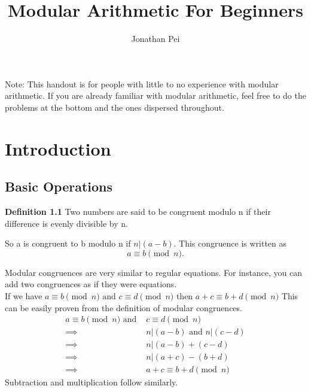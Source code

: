 \documentclass{article}
\begin{document}
\title{Modular Arithmetic For Beginners}
\author{Jonathan Pei}
\maketitle
Note: This handout is for people with little to no experience with modular arithmetic. If you are already familiar with modular arithmetic, feel free to do the problems at the bottom and the ones dispersed throughout.

\section{Introduction}
\subsection*{Basic Operations}
\begin{mdframed}
\textbf{Definition 1.1} Two numbers are said to be congruent modulo n if their difference is evenly divisible by n.\\
\end{mdframed}
So a is congruent to b modulo n if $n | (a-b)$. 
This congruence is written as 
$$ a \equiv b \pmod{n}.$$

Modular congruences are very similar to regular equations. For instance, you can add two congruences as if they were equations.\\
If we have 
$
    a \equiv b \pmod{n} \text{ and } c \equiv d \pmod{n} \text{ then } a+c \equiv b+d \pmod{n}
$
This can be easily proven from the definition of modular congruences. 
\begin{align*}
    a \equiv b \pmod{n} \text{  and  } &c \equiv d \pmod{n}\\
    \implies &n|(a-b) \text{  and  } n|(c-d) \\
    \implies &n|(a-b)+(c-d)\\
    \implies &n|(a+c)-(b+d)\\
    \implies &\boxed{a+c \equiv b+d \pmod{n}}
\end{align*}
Subtraction and multiplication follow similarly.\\
\end{document}
